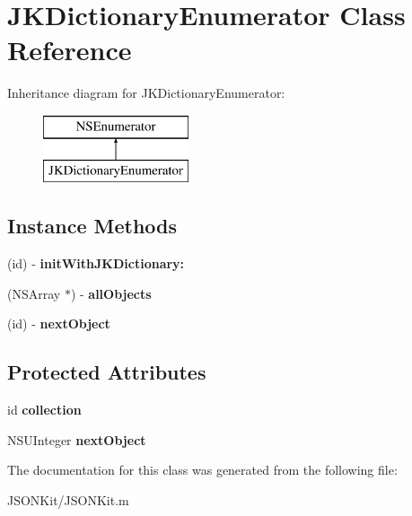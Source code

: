\hypertarget{interface_j_k_dictionary_enumerator}{\section{J\+K\+Dictionary\+Enumerator Class Reference}
\label{interface_j_k_dictionary_enumerator}
}
Inheritance diagram for J\+K\+Dictionary\+Enumerator\+:\begin{figure}[H]
\begin{center}
\leavevmode
\includegraphics[height=2.000000cm]{interface_j_k_dictionary_enumerator}
\end{center}
\end{figure}
\subsection*{Instance Methods}
\begin{DoxyCompactItemize}
\item 
\hypertarget{interface_j_k_dictionary_enumerator_a5085cc23ae119b8cdf4328f8333e6ae7}{(id) -\/ {\bfseries init\+With\+J\+K\+Dictionary\+:}}\label{interface_j_k_dictionary_enumerator_a5085cc23ae119b8cdf4328f8333e6ae7}

\item 
\hypertarget{interface_j_k_dictionary_enumerator_aeacc476cb120593fb2b140e019427c97}{(N\+S\+Array $\ast$) -\/ {\bfseries all\+Objects}}\label{interface_j_k_dictionary_enumerator_aeacc476cb120593fb2b140e019427c97}

\item 
\hypertarget{interface_j_k_dictionary_enumerator_ae72411e7e1dda3b91950ddcd210bb7cf}{(id) -\/ {\bfseries next\+Object}}\label{interface_j_k_dictionary_enumerator_ae72411e7e1dda3b91950ddcd210bb7cf}

\end{DoxyCompactItemize}
\subsection*{Protected Attributes}
\begin{DoxyCompactItemize}
\item 
\hypertarget{interface_j_k_dictionary_enumerator_a58e8ed040636b59b6c9eaeb0dc6c89f2}{id {\bfseries collection}}\label{interface_j_k_dictionary_enumerator_a58e8ed040636b59b6c9eaeb0dc6c89f2}

\item 
\hypertarget{interface_j_k_dictionary_enumerator_add4b08edabce81c31438ec3c16cd37d8}{N\+S\+U\+Integer {\bfseries next\+Object}}\label{interface_j_k_dictionary_enumerator_add4b08edabce81c31438ec3c16cd37d8}

\end{DoxyCompactItemize}


The documentation for this class was generated from the following file\+:\begin{DoxyCompactItemize}
\item 
J\+S\+O\+N\+Kit/J\+S\+O\+N\+Kit.\+m\end{DoxyCompactItemize}
